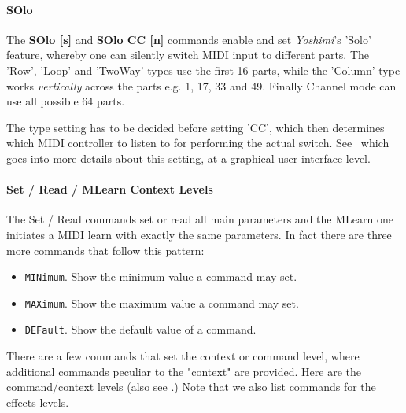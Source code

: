 \paragraph{SOlo}
\label{paragraph:command_line_solo}
   The \textbf{SOlo [s]} and \textbf{SOlo CC [n]}
   commands enable and set \textsl{Yoshimi}'s 'Solo' feature, whereby one can
   silently switch MIDI input to different parts.
   The 'Row', 'Loop' and 'TwoWay' types use the first 16 parts, while the
   'Column' type works \textsl{vertically} across the parts e.g. 1, 17, 33
   and 49. Finally Channel mode can use all possible 64 parts.

   The type setting has to be decided before setting 'CC', which then
   determines which MIDI controller to listen to for performing the actual
   switch. See ~which goes into more
   details about this setting, at a graphical user interface level.

\paragraph{Set / Read / MLearn Context Levels}
\label{paragraph:command_line_context_levels}

   The Set / Read commands set or read all main parameters and the MLearn one
   initiates a MIDI learn with exactly the same parameters.
   In fact there are three more commands that follow this pattern:

   \begin{itemize}
   \item \texttt{MINimum}. Show the minimum value a command may set.
   \item \texttt{MAXimum}. Show the maximum value a command may set.
   \item \texttt{DEFault}. Show the default value of a command.
   \end{itemize}

   There are a few commands that set the context or command level, where
   additional commands peculiar to the "context" are provided.  Here are the
   command/context levels
   (also see .)
   Note that we also list commands for the effects levels.

